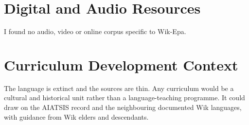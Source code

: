\documentclass[12pt]{article}
\begin{document}
\section{Digital and Audio Resources}
I found no audio, video or online corpus specific to Wik-Epa.

\section{Curriculum Development Context}
The language is extinct and the sources are thin. Any curriculum would be a cultural and historical unit rather than a language-teaching programme. It could draw on the AIATSIS record and the neighbouring documented Wik languages, with guidance from Wik elders and descendants.
\end{document}
